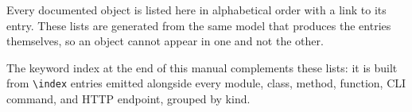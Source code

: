 
Every documented object is listed here in alphabetical order with a link to its
entry. These lists are generated from the same model that produces the entries
themselves, so an object cannot appear in one and not the other.

The keyword index at the end of this manual complements these lists: it is
built from \texttt{\textbackslash index} entries emitted alongside every
module, class, method, function, CLI command, and HTTP endpoint, grouped by
kind.


